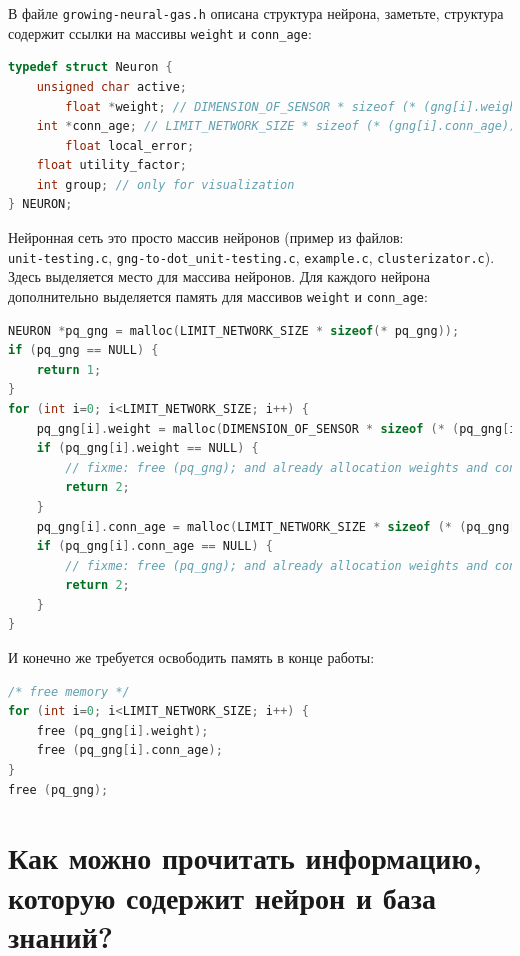 \documentclass[unicode, 12pt, a4paper,oneside,fleqn]{article}
\begin{document}
В файле \verb'growing-neural-gas.h' описана структура нейрона,
заметьте, структура содержит ссылки на массивы \verb'weight' и
\verb'conn_age':

\begin{lstlisting}[language=C,
  caption={Описание структуры нейрона},
  captionpos=b,
  label={nueron:code}]
typedef struct Neuron {
	unsigned char active;
        float *weight; // DIMENSION_OF_SENSOR * sizeof (* (gng[i].weight))
	int *conn_age; // LIMIT_NETWORK_SIZE * sizeof (* (gng[i].conn_age))
        float local_error;
	float utility_factor;
	int group; // only for visualization
} NEURON;
\end{lstlisting}


Нейронная сеть это просто массив нейронов (пример из файлов:\\
\verb'unit-testing.c', \verb'gng-to-dot_unit-testing.c',
\verb'example.c', \verb'clusterizator.c').  Здесь выделяется место
для массива нейронов.  Для каждого нейрона дополнительно выделяется
память для массивов \verb'weight' и \verb'conn_age':

\begin{lstlisting}[language=C,
  caption={Выделение памяти},
  captionpos=b,
  label={malloc:code}]
NEURON *pq_gng = malloc(LIMIT_NETWORK_SIZE * sizeof(* pq_gng));
if (pq_gng == NULL) {
	return 1;
}
for (int i=0; i<LIMIT_NETWORK_SIZE; i++) {
	pq_gng[i].weight = malloc(DIMENSION_OF_SENSOR * sizeof (* (pq_gng[i].weight)));
	if (pq_gng[i].weight == NULL) {
		// fixme: free (pq_gng); and already allocation weights and conn_ages
		return 2;
	}
	pq_gng[i].conn_age = malloc(LIMIT_NETWORK_SIZE * sizeof (* (pq_gng[i].conn_age)));
	if (pq_gng[i].conn_age == NULL) {
		// fixme: free (pq_gng); and already allocation weights and conn_ages
		return 2;
	}
}
\end{lstlisting}

И конечно же требуется освободить память в конце работы:
\begin{lstlisting}[language=C,
  caption={Освобождение памяти},
  captionpos=b,
  label={free:code}]
/* free memory */
for (int i=0; i<LIMIT_NETWORK_SIZE; i++) {
	free (pq_gng[i].weight);
	free (pq_gng[i].conn_age);
}
free (pq_gng);
\end{lstlisting}



\clearpage
\section{Как можно прочитать информацию, которую содержит нейрон и база знаний?}
\end{document}

